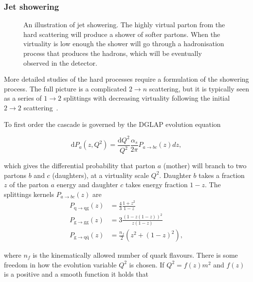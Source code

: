 \subsubsection{Jet showering}
\label{sec:shower}
\begin{figure}
\centering

\caption[Jet showering]{An illustration of jet showering. The highly virtual parton from the hard scattering will produce a shower of softer partons. When the virtuality is low enough the shower will go through a hadronisation process that produces the hadrons, which will be eventually observed in the detector. }
\label{fig:showering}
\end{figure}

More detailed studies of the hard processes require a formulation of the showering process. The full picture is a complicated $2\rightarrow n$ scattering, but it is typically seen as a series of $1\rightarrow2$ splittings with decreasing virtuality following the initial $2\rightarrow 2$ scattering~\cite{newPythiaShower}.

To first order the cascade is governed by the DGLAP evolution equation~\cite{Gribov:1972ri,Altarelli:1977zs,Dokshitzer:1977sg}

\begin{equation}
\mathrm{d} P_a\left(z,Q^2\right) = \frac{\mathrm{d}Q^2}{Q^2}\frac{\alpha_s}{2\pi} P_{a\rightarrow bc}\left(z\right)dz,
\label{eq:dglap}
\end{equation} 

\noindent which gives the differential probability that parton $a$ (mother) will branch to two partons $b$ and $c$ (daughters), at a virtuality scale $Q^2$. Daughter $b$ takes a fraction $z$ of the parton $a$ energy and daughter $c$ takes energy fraction $1-z$. The splittings kernels $P_{a\rightarrow bc}\left(z\right)$ are 
\nopagebreak
\begin{align}
P_\mathrm{q\rightarrow qg}\left(z\right) &= \frac{4}{3}\frac{1+z^2}{1-z} \\
P_\mathrm{g\rightarrow gg}\left(z\right) &= 3\frac{\left(1-z\left(1-z \right) \right)^2}{z\left(1-z\right)} \\
P_\mathrm{g\rightarrow q \bar q}\left(z\right)& = \frac{n_f}{2}\left( z^2+\left(1-z\right)^2\right),
\end{align}

\noindent where $n_f$ is the kinematically allowed number of quark flavours. There is some freedom in how the evolution variable $Q^2$ is chosen. If $Q^2=f\left(z \right) m^2$ and $f\left(z \right)$ is a positive and a smooth function it holds that

